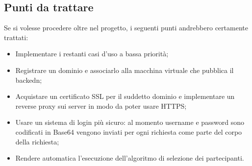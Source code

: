 \subsection{Punti da trattare}
Se si volesse procedere oltre nel progetto, i seguenti punti andrebbero certamente trattati:
\begin{itemize}
  \item Implementare i restanti casi d'uso a bassa priorità;
  \item Registrare un dominio e associarlo alla macchina virtuale che pubblica il backedn;
  \item Acquistare un certificato SSL per il suddetto dominio e implementare un reverse proxy sui server in modo da poter usare HTTPS;
  \item Usare un sistema di login più sicuro: al momento username e password sono codificati in Base64 vengono inviati per ogni richiesta come parte del corpo della richiesta;
  \item Rendere automatica l'esecuzione dell'algoritmo di selezione dei partecipanti.
\end{itemize}